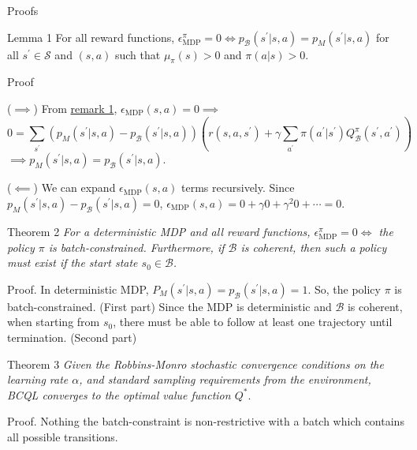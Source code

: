 \documentclass[11pt]{beamer}
\newcommand{\mc}[1]{\mathcal{#1}}
\newcommand{\ti}[1]{\textit{#1}}
\begin{document}
\begin{frame}{Proofs}
    \begin{block}{Lemma 1}
        For all reward functions, $\epsilon^\pi_{\text{MDP}} =0 \iff p_{\mc{B}}(s^\prime|s,a) = p_M(s^\prime|s,a)$ for all $s^\prime \in \mc{S}$ and $(s,a)$ such that $\mu_\pi (s) > 0$ and $\pi(a|s) > 0$.

        \smallskip
        Proof

        ($\implies$) From \hyperlink{eq:remark1}{remark 1}, $\epsilon_{\text{MDP}}(s,a) =0 \implies $
        \[
        0 = \sum_{s^\prime} (p_M(s^\prime|s,a) - p_{\mc{B}}(s^\prime|s,a)) \left(r(s,a,s^\prime) + \gamma \sum_{a^\prime}\pi(a^\prime|s^\prime) Q^\pi_{\mc{B}}(s^\prime,a^\prime)\right)
        \]
        $\implies p_M (s^\prime|s,a) = p_{\mc{B}}(s^\prime|s,a)$.

        ($\impliedby$) We can expand $\epsilon_{\text{MDP}}(s,a)$ terms recursively.
        Since $p_M(s^\prime|s,a) - p_{\mc{B}}(s^\prime|s,a) = 0$, $\epsilon_{\text{MDP}}(s,a) = 0 + \gamma 0 + \gamma^2 0 + \cdots  = 0$.
    \end{block}
    \begin{block}{Theorem 2} \label{th:2}
        \ti{For a deterministic MDP and all reward functions, $\epsilon^\pi_{\text{MDP}}=0 \iff$ the policy $\pi$ is batch-constrained.
        Furthermore, if $\mc{B}$ is coherent, then such a policy must exist if the start state $s_0 \in \mc{B}$.
        }

        Proof. In deterministic MDP, $P_M(s^\prime |s,a) = p_{\mc{B}}(s^\prime|s,a) =1$. So, the policy $\pi$ is batch-constrained. (First part)
        Since the MDP is deterministic and $\mc{B}$ is coherent, when starting from $s_0$, there must be able to follow at least one trajectory until termination. (Second part)
    \end{block}
    \begin{block}{Theorem 3} \label{th:3}
        \ti{Given the Robbins-Monro stochastic convergence conditions on the learning rate $\alpha$, and standard sampling requirements from the environment, BCQL converges to the optimal value function $Q^\ast$}.

        Proof. Nothing the batch-constraint is non-restrictive with a batch which contains all possible transitions.
    \end{block}
\end{frame}
\end{document}

